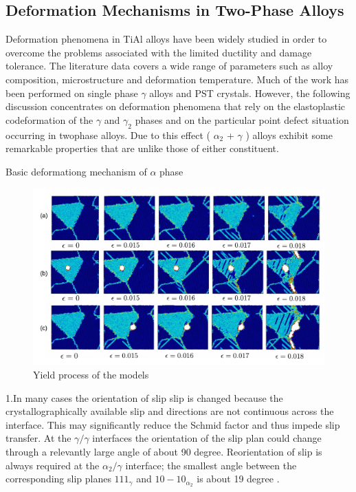 \documentclass[times,12pt]{elsarticle}
\begin{document}
\subsection{Deformation Mechanisms in Two-Phase Alloys}
Deformation phenomena in TiAl alloys have been widely studied in order to overcome the problems associated with the limited ductility and damage tolerance. The literature data covers a wide range of parameters such as alloy composition, microstructure and deformation temperature. Much of the work has been performed on single phase $\gamma$ alloys and PST crystals. However, the following discussion concentrates on deformation phenomena that rely on the elastoplastic codeformation of the $\gamma$ and $\gamma_2$ phases and on the particular point defect situation occurring in twophase alloys. Due to this effect ( $\alpha_2$ + $\gamma$ ) alloys exhibit some remarkable properties that are unlike those of either constituent.

Basic deformationg mechanism of $\alpha$ phase 

\begin{figure}[h]
	\centering
	\includegraphics[width=1\linewidth]{"img/fracture3"}
	\caption{Yield process of the models}
	\label{fig:yield}
\end{figure}

1.In many cases the orientation of slip slip is changed because the crystallographically available slip and directions are not continuous across the interface. This may significantly reduce the Schmid factor and thus impede slip transfer. At the $\gamma/\gamma$ interfaces the orientation of the slip plan could change through a relevantly large angle of about 90 degree. Reorientation of slip is always required at the $\alpha_{2}/\gamma$ interface; the smallest angle between the corresponding slip planes ${1 1 1 }_{\gamma}$ and ${ 1 0 -1 0}_{\alpha_2}$ is about 19 degree \cite{}.
\end{document}
